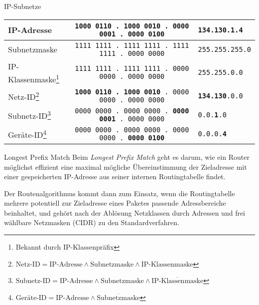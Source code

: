 \begin{example}{IP-Subnetze}
    \begin{center}
        \begin{tabular}{|l||c|l|}
            \hline
            IP-Adresse                                                                                                                     & \texttt{1000 0110 . 1000 0010 . 0000 0001 . 0000 0100}          & \texttt{134.130.1.4}          \\\hline
            Subnetzmaske                                                                                                                   & \texttt{1111 1111 . 1111 1111 . 1111 1111 . 0000 0000}          & \texttt{255.255.255.0}        \\\hline
            IP-Klassenmaske\footnote{Bekannt durch IP-Klassenpräfix}                                                                       & \texttt{1111 1111 . 1111 1111 . 0000 0000 . 0000 0000}          & \texttt{255.255.0.0}          \\\hline
            Netz-ID\footnote{$\text{Netz-ID} = \text{IP-Adresse} \land \text{Subnetzmaske} \land \text{IP-Klassenmaske}$}                  & \texttt{\textbf{1000 0110 . 1000 0010} . 0000 0000 . 0000 0000} & \texttt{\textbf{134.130}.0.0} \\\hline
            Subnetz-ID\footnote{$\text{Subnetz-ID} = \text{IP-Adresse} \land \text{Subnetzmaske} \land \overline{\text{IP-Klassenmaske}}$} & \texttt{0000 0000 . 0000 0000 . \textbf{0000 0001} . 0000 0000} & \texttt{0.0.\textbf{1}.0}     \\\hline
            Geräte-ID\footnote{$\text{Geräte-ID} = \text{IP-Adresse} \land	\overline{\text{Subnetzmaske}}$}                                 & \texttt{0000 0000 . 0000 0000 . 0000 0000 . \textbf{0000 0100}} & \texttt{0.0.0.\textbf{4}}     \\\hline
        \end{tabular}
    \end{center}
\end{example}

\begin{defi}{Longest Prefix Match}
    Beim \emph{Longest Prefix Match} geht es darum, wie ein Router möglichst effizient eine maximal mögliche Übereinstimmung der Zieladresse mit einer gespeicherten IP-Adresse aus seiner internen Routingtabelle findet.

    Der Routenalgorithmus kommt dann zum Einsatz, wenn die Routingtabelle mehrere potentiell zur Zieladresse eines Paketes passende Adressbereiche beinhaltet, und gehört nach der Ablösung Netzklassen durch Adressen und frei wählbare Netzmasken (CIDR) zu den Standardverfahren.
\end{defi}

